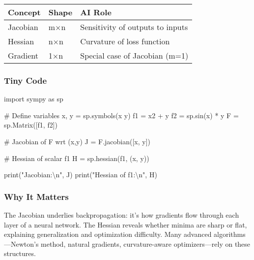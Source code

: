 \documentclass[
  letterpaper,
  DIV=11,
  numbers=noendperiod]{scrreprt}
\newenvironment{Shaded}{\begin{snugshade}}{\end{snugshade}}
\newcommand{\BuiltInTok}[1]{\textcolor[rgb]{0.00,0.23,0.31}{#1}}
\newcommand{\CharTok}[1]{\textcolor[rgb]{0.13,0.47,0.30}{#1}}
\newcommand{\CommentTok}[1]{\textcolor[rgb]{0.37,0.37,0.37}{#1}}
\newcommand{\ImportTok}[1]{\textcolor[rgb]{0.00,0.46,0.62}{#1}}
\newcommand{\NormalTok}[1]{\textcolor[rgb]{0.00,0.23,0.31}{#1}}
\newcommand{\OperatorTok}[1]{\textcolor[rgb]{0.37,0.37,0.37}{#1}}
\newcommand{\StringTok}[1]{\textcolor[rgb]{0.13,0.47,0.30}{#1}}
\begin{document}
\begin{longtable}[]{@{}lll@{}}
\toprule\noalign{}
Concept & Shape & AI Role \\
\midrule\noalign{}
\endhead
\bottomrule\noalign{}
\endlastfoot
Jacobian & m×n & Sensitivity of outputs to inputs \\
Hessian & n×n & Curvature of loss function \\
Gradient & 1×n & Special case of Jacobian (m=1) \\
\end{longtable}

\subsubsection{Tiny Code}\label{tiny-code-114}

\begin{Shaded}
\begin{Highlighting}[]
\ImportTok{import}\NormalTok{ sympy }\ImportTok{as}\NormalTok{ sp}

\CommentTok{\# Define variables}
\NormalTok{x, y }\OperatorTok{=}\NormalTok{ sp.symbols(}\StringTok{\textquotesingle{}x y\textquotesingle{}}\NormalTok{)}
\NormalTok{f1 }\OperatorTok{=}\NormalTok{ x2 }\OperatorTok{+}\NormalTok{ y}
\NormalTok{f2 }\OperatorTok{=}\NormalTok{ sp.sin(x) }\OperatorTok{*}\NormalTok{ y}
\NormalTok{F }\OperatorTok{=}\NormalTok{ sp.Matrix([f1, f2])}

\CommentTok{\# Jacobian of F wrt (x,y)}
\NormalTok{J }\OperatorTok{=}\NormalTok{ F.jacobian([x, y])}

\CommentTok{\# Hessian of scalar f1}
\NormalTok{H }\OperatorTok{=}\NormalTok{ sp.hessian(f1, (x, y))}

\BuiltInTok{print}\NormalTok{(}\StringTok{"Jacobian:}\CharTok{\textbackslash{}n}\StringTok{"}\NormalTok{, J)}
\BuiltInTok{print}\NormalTok{(}\StringTok{"Hessian of f1:}\CharTok{\textbackslash{}n}\StringTok{"}\NormalTok{, H)}
\end{Highlighting}
\end{Shaded}

\subsubsection{Why It Matters}\label{why-it-matters-12}

The Jacobian underlies backpropagation: it's how gradients flow through
each layer of a neural network. The Hessian reveals whether minima are
sharp or flat, explaining generalization and optimization difficulty.
Many advanced algorithms---Newton's method, natural gradients,
curvature-aware optimizers---rely on these structures.
\end{document}
